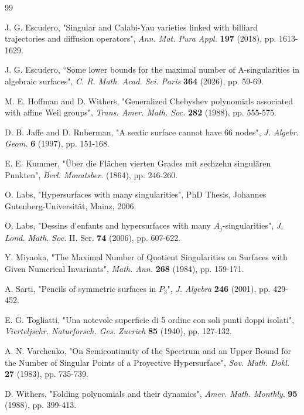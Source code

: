\documentclass{birkjour_t2}
\theoremstyle{definition}
\theoremstyle{remark}
\numberwithin{equation}{section}
\begin{document}
\begin{thebibliography}{99}
\par 
{} J. G. Escudero,  "Singular and Calabi-Yau varieties linked  with  billiard trajectories and diffusion operators",  {\it  Ann. Mat. Pura Appl.} \textbf{197} (2018), pp. 1613-1629.
\par 
{} J. G. Escudero, “Some lower bounds for the maximal number of A-singularities in algebraic surfaces", {\it C. R. Math. Acad. Sci. Paris} \textbf{364} (2026), pp. 59-69.
\par 
   M. E. Hoffman and  D. Withers, "Generalized Chebyshev polynomials associated with affine Weil groups",  
  {\it  Trans. Amer. Math. Soc.} {\bf 282} (1988), pp. 555-575. 
   \par  
   D. B. Jaffe and D. Ruberman,  "A sextic surface cannot have 66 nodes", {\it  J. Algebr. Geom.}  {\bf 6} (1997), pp. 151-168.
  \par 
    E. E. Kummer,  "Über die Flächen vierten Grades mit sechzehn singulären Punkten", {\it 
    Berl. Monatsber.} (1864), pp. 246-260.
 \par 
    O. Labs, "Hypersurfaces with many singularities", PhD Thesis, Johannes Gutenberg-Universität, Mainz, 2006.
\par 
{} O. Labs,  "Dessins d\'{}enfants and hypersurfaces with many $A_{j}$-singularities",  {\it J. Lond. Math. Soc.} II. Ser. {\bf 74}   (2006), pp. 607-622. 
\par 
{}  Y. Miyaoka, "The Maximal Number of Quotient Singularities on Surfaces with Given Numerical Invariants", {\it Math. Ann.}  {\bf 268} (1984), pp. 159-171.
\par 
{} A. Sarti, "Pencils of symmetric surfaces in $P_{3}$", {\it  J. Algebra}  {\bf 246}  (2001), pp. 429-452.
\par 
{}  E. G. Togliatti, "Una notevole superficie di 5 ordine con soli punti doppi isolati", {\it Vierteljschr. Naturforsch. Ges. Zuerich } {\bf 85} (1940), pp. 127-132.
\par 
{} A. N. Varchenko, "On Semicontinuity of the Spectrum and an Upper Bound for the Number of Singular Points of a Proyective Hypersurface", {\it Sov. Math. Dokl.} {\bf 27}  (1983), pp. 735-739.
\par 
   D. Withers, "Folding polynomials and their dynamics",  {\it Amer. Math. Monthly}. {\bf 95} (1988), pp. 399-413.
\par

\end{thebibliography}



\par

\end{document}
